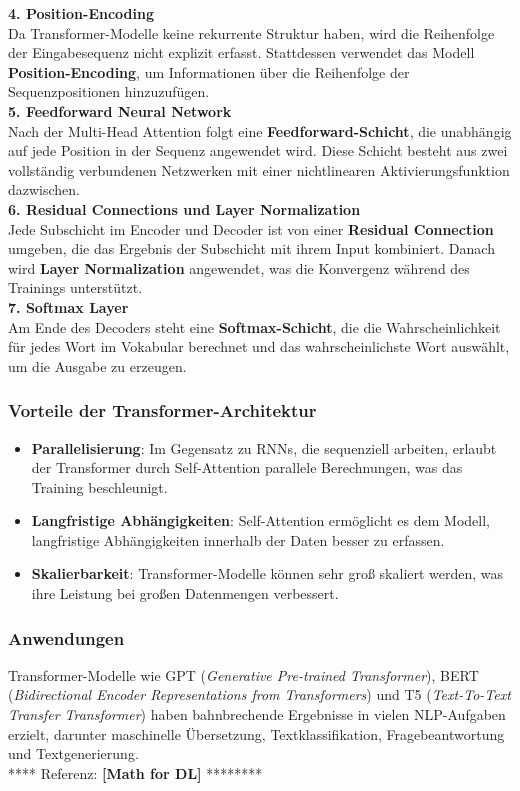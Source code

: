 \documentclass[12pt]{article}
\begin{document}
%
\textbf{4. Position-Encoding}\\
Da Transformer-Modelle keine rekurrente Struktur haben, wird die Reihenfolge der Eingabesequenz nicht explizit erfasst. Stattdessen verwendet das Modell \textbf{Position-Encoding}, um Informationen über die Reihenfolge der Sequenzpositionen hinzuzufügen.\\[0.2cm]
%
\textbf{5. Feedforward Neural Network}\\
Nach der Multi-Head Attention folgt eine \textbf{Feedforward-Schicht}, die unabhängig auf jede Position in der Sequenz angewendet wird. Diese Schicht besteht aus zwei vollständig verbundenen Netzwerken mit einer nichtlinearen Aktivierungsfunktion dazwischen.\\[0.2cm]
%
\textbf{6. Residual Connections und Layer Normalization}\\
Jede Subschicht im Encoder und Decoder ist von einer \textbf{Residual Connection} umgeben, die das Ergebnis der Subschicht mit ihrem Input kombiniert. Danach wird \textbf{Layer Normalization} angewendet, was die Konvergenz während des Trainings unterstützt.\\[0.2cm]
%
\textbf{7. Softmax Layer}\\
Am Ende des Decoders steht eine \textbf{Softmax-Schicht}, die die Wahrscheinlichkeit für jedes Wort im Vokabular berechnet und das wahrscheinlichste Wort auswählt, um die Ausgabe zu erzeugen.
%
\subsubsection{Vorteile der Transformer-Architektur}
\begin{itemize}
    \item \textbf{Parallelisierung}: Im Gegensatz zu RNNs, die sequenziell arbeiten, erlaubt der Transformer durch Self-Attention parallele Berechnungen, was das Training beschleunigt.
    \item \textbf{Langfristige Abhängigkeiten}: Self-Attention ermöglicht es dem Modell, langfristige Abhängigkeiten innerhalb der Daten besser zu erfassen.
    \item \textbf{Skalierbarkeit}: Transformer-Modelle können sehr groß skaliert werden, was ihre Leistung bei großen Datenmengen verbessert.
\end{itemize}

\subsubsection{Anwendungen}
Transformer-Modelle wie GPT (\textit{Generative Pre-trained Transformer}), BERT (\textit{Bidirectional Encoder Representations from Transformers}) und T5 (\textit{Text-To-Text Transfer Transformer}) haben bahnbrechende Ergebnisse in vielen NLP-Aufgaben erzielt, darunter maschinelle Übersetzung, Textklassifikation, Fragebeantwortung und Textgenerierung. \\[0.2cm] 
**** Referenz: \textbf{[Math for DL]} ******** 
\end{document}
